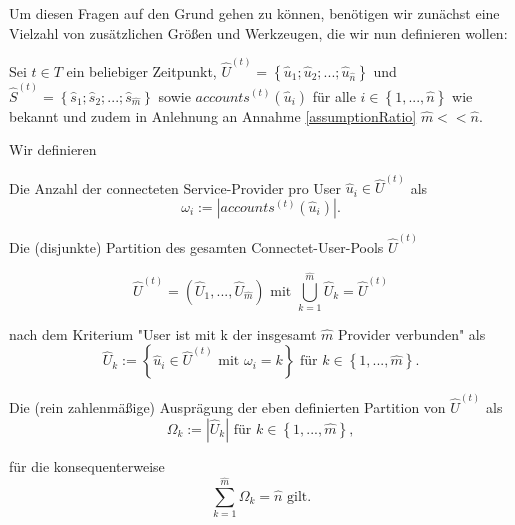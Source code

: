 Um diesen Fragen auf den Grund gehen zu können, benötigen wir zunächst eine Vielzahl von zusätzlichen Größen und Werkzeugen, die wir nun definieren wollen:

\vspace{0.3cm}

\begin{Def}\label{defSequenzierung}

Sei $t \in T$ ein beliebiger Zeitpunkt, $\widehat{U}^{(t)} = \left\{ \widehat{u}_1; \widehat{u}_2;...; \widehat{u}_{\widehat{n}} \right\}$ und $\widehat{S}^{(t)} = \left\{ \widehat{s}_1; \widehat{s}_2;...; \widehat{s}_{\widehat{m}} \right\}$ sowie $accounts^{(t)}(\widehat{u}_{i})$ für alle $i \in \left\{1,...,\widehat{n} \right\}$ wie bekannt und zudem in Anlehnung an Annahme \ref{assumptionRatio} $\widehat{m} << \widehat{n}$.

Wir definieren

\vspace{0.3cm}

Die Anzahl der connecteten Service-Provider pro User $\widehat{u}_i \in \widehat{U}^{(t)}$ als
\begin{equation*}
\omega_i := \left| accounts^{(t)}(\widehat{u}_{i}) \right|. \tag{i}
\end{equation*}

\vspace{0.3cm}

Die (disjunkte) Partition des gesamten Connectet-User-Pools $\widehat{U}^{(t)}$

\begin{equation*}
\widehat{U}^{(t)} = \left( \widehat{U}_1,...,\widehat{U}_{\widehat{m}} \right) \textrm{ mit } \bigcup_{k=1}^{\widehat{m}} \widehat{U}_k = \widehat{U}^{(t)}
\end{equation*}

nach dem Kriterium "User ist mit k der insgesamt $\widehat{m}$ Provider verbunden" als
\begin{equation*}
\widehat{U}_k := \left\{ \widehat{u}_i \in \widehat{U}^{(t)} \textrm{ mit } \omega_i = k \right\} \textrm{ für } k \in \left\{1,...,\widehat{m} \right\}. \tag{ii}
\end{equation*}

\vspace{0.3cm}

Die (rein zahlenmäßige) Ausprägung der eben definierten Partition von $\widehat{U}^{(t)}$ als
\begin{equation*}
\Omega_k := \left| \widehat{U}_k \right| \textrm{ für } k \in \left\{1,...,\widehat{m} \right\}, \tag{iii}
\end{equation*}

\vspace{0.3cm}

für die konsequenterweise
\begin{equation*}
\sum_{k=1}^{\widehat{m}} \Omega_k = \widehat{n} \textrm{ gilt.}
\end{equation*}


\end{Def}











